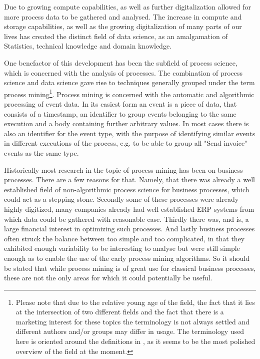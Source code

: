 \documentclass[runningheads]{template/llncs}
\begin{document}
Due to growing compute capabilities, as well as further digitalization allowed for more process data to be gathered and analysed.
The increase in compute and storage capabilities, as well as the growing digitalization of many parts of our lives has created the distinct field of data science, as an amalgamation of Statistics, technical knowledge and domain knowledge.

One benefactor of this development has been the subfield of process science, which is concerned with the analysis of processes.
The combination of process science and data science gave rise to techniques generally grouped under the term process mining\footnote{Please note that due to the relative young age of the field, the fact that it lies at the intersection of two different fields and the fact that there is a marketing interest for these topics the terminology is not always settled and different authors and/or groups may differ in usage. The terminology used here is oriented around the definitions in \cite{Aals16}, as it seems to be the most polished overview of the field at the moment.}.
Process mining is concerned with the automatic and algorithmic processing of event data. In its easiest form an event is a piece of data, that consists of a timestamp, an identifier to group events belonging to the same execution and a body containing further arbitrary values.
In most cases there is also an identifier for the event type, with the purpose of identifying similar events in different executions of the process, e.g. to be able to group all "Send invoice" events as the same type.

Historically most research in the topic of process mining has been on business processes. 
There are a few reasons for that. 
Namely, that there was already a well established field of non-algorithmic process science for business processes, which could act as a stepping stone.
Secondly some of these processes were already highly digitized, many companies already had well established ERP systems from which data could be gathered with reasonable ease.
Thirdly there was, and is, a large financial interest in optimizing such processes.
And lastly business processes often struck the balance between too simple and too complicated, in that they exhibited enough variability to be interesting to analyse but were still simple enough as to enable the use of the early process mining algorithms.
So it should be stated that while process mining is of great use for classical business processes, these are not the only areas for which it could potentially be useful.
\end{document}

